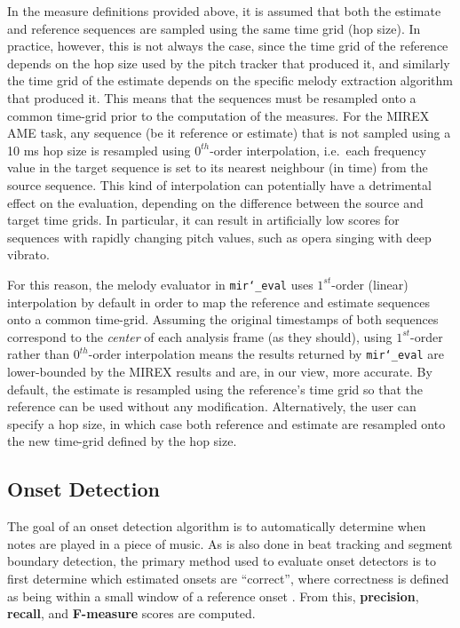 \documentclass{article}
\def\mireval{\texttt{mir\char`_eval}}
\begin{document}
In the measure definitions provided above, it is assumed that both the estimate
and reference sequences are sampled using the same time grid (hop size). In
practice, however, this is not always the case, since the time grid of the
reference depends on the hop size used by the pitch tracker that produced
it, and similarly the time grid of the estimate depends on the specific melody
extraction algorithm that produced it. This means that the sequences must be
resampled onto a common time-grid prior to the computation of the measures. For
the MIREX AME task, any sequence (be it reference or estimate) that is not
sampled using a 10 ms hop size is resampled using $0^{th}$-order interpolation,
i.e.~each frequency value in the target sequence is set to its nearest
neighbour (in time) from the source sequence. This kind of interpolation can
potentially have a detrimental effect on the evaluation, depending on the
difference between the source and target time grids. In particular, it can
result in artificially low scores for sequences with rapidly changing pitch
values, such as opera singing with deep vibrato. 

For this reason, the melody evaluator in \mireval{} uses $1^{st}$-order (linear)
interpolation by default in order to map the reference and estimate sequences
onto a common time-grid. Assuming the original timestamps of both sequences
correspond to the \textit{center} of each analysis frame (as they should),
using $1^{st}$-order rather than $0^{th}$-order interpolation means the results
returned by \mireval{} are lower-bounded by the MIREX results and are, in our
view, more accurate. By default, the estimate is resampled using the reference's
time grid so that the reference can be used without any modification.
Alternatively, the user can specify a hop size, in which case both
reference and estimate are resampled onto the new time-grid defined by the hop
size.

\subsection{Onset Detection}

The goal of an onset detection algorithm is to automatically determine when notes are played in a piece of music.
As is also done in beat tracking and segment boundary detection, the primary method used to evaluate onset detectors is to first determine which estimated onsets are ``correct'', where correctness is defined as being within a small window of a reference onset \cite{bock2012evaluating}.
From this, \textbf{precision}, \textbf{recall}, and \textbf{F-measure} scores are computed.
\end{document}
